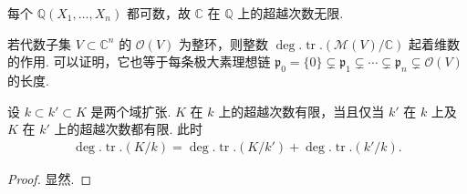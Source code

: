 \begin{example*}
每个 $\mathbb Q(X_1,\ldots,X_n)$ 都可数，故 $\mathbb C$ 在 $\mathbb Q$ 上的超越次数无限.
\end{example*}
\begin{remark*}
若代数子集 $V\subset\mathbb C^n$ 的 $\mathcal O(V)$ 为整环，则整数 $\deg.\operatorname{tr}.(\mathcal M(V)/\mathbb C)$ 起着维数的作用. 可以证明，它也等于每条极大素理想链 $\mathfrak p_0=\{0\}\subsetneq\mathfrak p_1\subsetneq\cdots\subsetneq\mathfrak p_n\subsetneq\mathcal O(V)$ 的长度.
\end{remark*}
\begin{lemma*}
设 $k\subset k'\subset K$ 是两个域扩张. $K$ 在 $k$ 上的超越次数有限，当且仅当 $k'$ 在 $k$ 上及 $K$ 在 $k'$ 上的超越次数都有限. 此时
\begin{align*}
\deg.\operatorname{tr}.(K/k)=\deg.\operatorname{tr}.(K/k')+\deg.\operatorname{tr}.(k'/k).
\end{align*}
\end{lemma*}
\begin{proof}显然.\end{proof}

